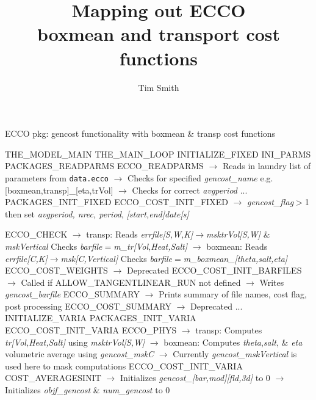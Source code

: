 \documentclass[a4paper,10pt]{article}
\title{\vspace{-8ex}Mapping out ECCO \\ boxmean and transport cost functions}
\author{Tim Smith}
\date{\vspace{-5ex}}
\newcommand{\ai}{\hspace{\algorithmicindent}}
\begin{document}
\maketitle

\begin{algorithm}
  \caption{ECCO pkg: gencost functionality with boxmean \& transp cost functions}
  \begin{algorithmic}
   \label{alg:ecco}
   \STATE
   \STATE THE\_MODEL\_MAIN
   \STATE\ai THE\_MAIN\_LOOP
   \STATE\ai\ai INITIALIZE\_FIXED
   \STATE\ai\ai\ai INI\_PARMS
   \STATE\ai\ai\ai\ai PACKAGES\_READPARMS
   \STATE\ai\ai\ai\ai\ai ECCO\_READPARMS
   \STATE\ai\ai\ai\ai\ai\ai $\rightarrow$ Reads in laundry list of parameters from \texttt{data.ecco}
   \STATE\ai\ai\ai\ai\ai\ai $\rightarrow$ Checks for specified \textit{gencost\_name} e.g. [boxmean,transp]\_[eta,trVol]
   \STATE\ai\ai\ai\ai\ai\ai $\rightarrow$ Checks for correct \textit{avgperiod}
   \STATE...
   \STATE\ai\ai\ai PACKAGES\_INIT\_FIXED
   \STATE\ai\ai\ai\ai ECCO\_COST\_INIT\_FIXED
   \STATE\ai\ai\ai\ai\ai $\rightarrow$ \textit{gencost\_flag}$>$1 then set \textit{avgperiod, nrec, period}, \textit{[start,end]date[s]}
   
   \STATE\ai\ai\ai\ai\ai ECCO\_CHECK
   \STATE\ai\ai\ai\ai\ai\ai $\rightarrow$ transp: Reads \textit{errfile[S,W,K]}$\rightarrow$\textit{msktrVol[S,W]} \& \textit{mskVertical} 
   \STATE\ai\ai\ai\ai\ai\ai\ai  Checks \textit{barfile}$=$\textit{m\_tr[Vol,Heat,Salt]}
   \STATE\ai\ai\ai\ai\ai\ai $\rightarrow$ boxmean: Reads \textit{errfile[C,K]}$\rightarrow$\textit{msk[C,Vertical]}
   \STATE\ai\ai\ai\ai\ai\ai\ai  Checks \textit{barfile}$=$\textit{m\_boxmean\_[theta,salt,eta]}
   \STATE\ai\ai\ai\ai\ai ECCO\_COST\_WEIGHTS
   \STATE\ai\ai\ai\ai\ai\ai $\rightarrow$ Deprecated
   \STATE\ai\ai\ai\ai\ai ECCO\_COST\_INIT\_BARFILES
   \STATE\ai\ai\ai\ai\ai\ai $\rightarrow$ Called if ALLOW\_TANGENTLINEAR\_RUN not defined
   \STATE\ai\ai\ai\ai\ai\ai $\rightarrow$ Writes \textit{gencost\_barfile}
   \STATE\ai\ai\ai\ai\ai ECCO\_SUMMARY
   \STATE\ai\ai\ai\ai\ai\ai $\rightarrow$ Prints summary of file names, cost flag, post processing 
   \STATE\ai\ai\ai\ai\ai ECCO\_COST\_SUMMARY
   \STATE\ai\ai\ai\ai\ai\ai $\rightarrow$ Deprecated
   \STATE...
   \STATE\ai\ai INITIALIZE\_VARIA
   \STATE\ai\ai\ai PACKAGES\_INIT\_VARIA
   \STATE\ai\ai\ai\ai ECCO\_COST\_INIT\_VARIA
   \STATE\ai\ai\ai\ai\ai ECCO\_PHYS
   \STATE\ai\ai\ai\ai\ai\ai $\rightarrow$ transp: Computes \textit{tr[Vol,Heat,Salt]} using \textit{msktrVol[S,W]}
   \STATE\ai\ai\ai\ai\ai\ai $\rightarrow$ boxmean: Computes \textit{theta},\textit{salt}, \& \textit{eta} volumetric average using \textit{gencost\_mskC} 
   \STATE\ai\ai\ai\ai\ai\ai $\rightarrow$ Currently \textit{gencost\_mskVertical} is used here to mask computations
   \STATE\ai\ai\ai\ai\ai ECCO\_COST\_INIT\_VARIA
   \STATE\ai\ai\ai\ai\ai\ai COST\_AVERAGESINIT
   \STATE\ai\ai\ai\ai\ai\ai\ai $\rightarrow$ Initializes \textit{gencost\_[bar,mod][fld,3d]} to 0
   \STATE\ai\ai\ai\ai\ai\ai $\rightarrow$ Initializes \textit{objf\_gencost} \& \textit{num\_gencost} to 0


\end{algorithmic}
\end{algorithm}
\end{document}
